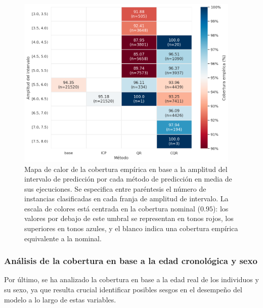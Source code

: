 \begin{figure}[h]
    \centering
    \includegraphics[width=0.95\textwidth]{capitulos/cap_05/imagenes/AE_coverage_by_interval_width.png}
    \caption[
        Problema de estimación de edad: 
        Mapa de calor de la cobertura empírica en base a la amplitud del intervalo de predicción por cada método de predicción en media de sus ejecuciones. 
    ]{
        Mapa de calor de la cobertura empírica en base a la amplitud del intervalo de predicción por cada método de predicción en media de sus ejecuciones. 
        Se especifica entre paréntesis el número de instancias clasificadas en cada franja de amplitud de intervalo.
        La escala de colores está centrada en la cobertura nominal ($0.95$): los valores por debajo de este umbral se representan en tonos rojos, los superiores en tonos azules, y el blanco indica una cobertura empírica equivalente a la nominal.
    }
    \label{fig:AE_coverage_by_interval_width}
\end{figure}

\FloatBarrier


\subsubsection{Análisis de la cobertura en base a la edad cronológica y sexo}

Por último, se ha analizado la cobertura en base a la edad real de los individuos y su sexo, ya que resulta crucial identificar posibles sesgos en el desempeño del modelo a lo largo de estas variables.

